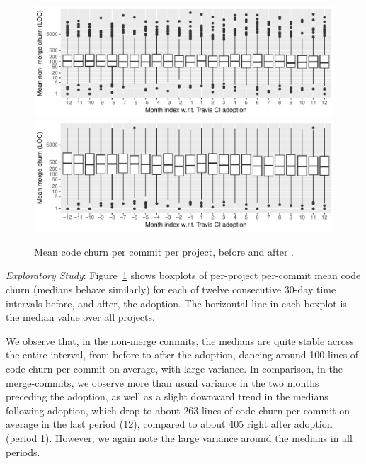 \begin{figure}[t]
\centering
\includegraphics[width=\columnwidth, clip=true, trim=0 0 0 0]{figures/churn-non-merge.pdf}
\includegraphics[width=\columnwidth, clip=true, trim=0 0 0 0]{figures/churn-merge.pdf}
\caption{Mean code churn per commit per project, before and after \Tvi.}
\label{fig:churn}
\end{figure}

\smallskip\noindent \emph{Exploratory Study}: 
Figure~\ref{fig:churn} shows boxplots of per-project per-commit mean code 
churn (medians behave similarly) for each of twelve consecutive 30-day time 
intervals before, and after, the \Tvis adoption.
The horizontal line in each boxplot is the median value over all projects.

We observe that, in the non-merge commits, the medians are quite stable
across the entire interval, from before to after the \Tvis adoption, dancing 
around 100 
lines of code churn per commit on average, with large variance.
In comparison, in the merge-commits, we observe more than usual variance
in the two months preceding the adoption, as well as a slight downward trend 
in the medians following adoption, which drop to about 263 lines of code churn 
per commit on average in the last period (12), compared to about 405 right after 
adoption (period 1).
However, we again note the large variance around the medians in all periods.


